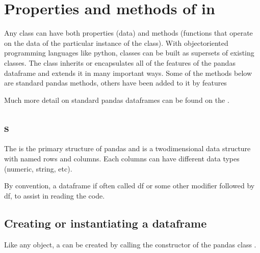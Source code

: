 \documentclass[letterpaper,10pt,english]{jupyterBook}
\begin{document}
\section{Properties and methods of  in }
\label{\detokenize{content/04_PythonEssentials/PythonPandasDataframes:properties-and-methods-of-dataframes-in-modelflow}}
\sphinxAtStartPar
Any class can have both properties (data) and methods (functions that operate on the data of the particular instance of the class). With object\sphinxhyphen{}oriented programming languages like python, classes can be built as supersets of existing classes. The  class  inherits or encapsulates all of the features of the pandas dataframe and extends it in many important ways.  Some of the methods below are standard pandas methods, others have been added to it by  features

\sphinxAtStartPar
Much more detail on standard pandas dataframes can be found on the .


\subsection{s}
\label{\detokenize{content/04_PythonEssentials/PythonPandasDataframes:dataframes}}
\sphinxAtStartPar
The  is the primary structure of pandas and is a two\sphinxhyphen{}dimensional data structure with named rows and columns.  Each columns can have different data types (numeric, string, etc).

\sphinxAtStartPar
By convention, a dataframe if often called df or some other modifier followed by df, to assist in reading the code.


\subsection{Creating or instantiating a dataframe}
\label{\detokenize{content/04_PythonEssentials/PythonPandasDataframes:creating-or-instantiating-a-dataframe}}
\sphinxAtStartPar
Like any object, a  can be created by calling the constructor of the pandas class .
\end{document}
